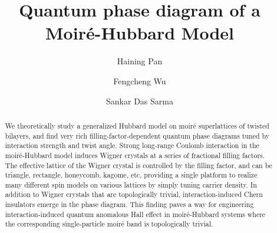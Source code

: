 \documentclass[aps,prl,floatfix,twocolumn]{revtex4-1}
\begin{document}
	
	\title{Quantum phase diagram of a Moir\'e-Hubbard Model}

\author{Haining Pan}
\author{Fengcheng Wu}
\author{Sankar Das Sarma}

\begin{abstract}
	We theoretically study a generalized Hubbard model on moir\'e superlattices of twisted bilayers, and find very rich filling-factor-dependent quantum phase diagrams tuned by interaction strength and twist angle. Strong long-range Coulomb interaction in the moir\'e-Hubbard model induces Wigner crystals at a series of fractional filling factors. The effective lattice of the Wigner crystal is controlled by the filling factor, and can be triangle, rectangle, honeycomb, kagome, etc, providing a single platform to realize many different spin models on various lattices by simply tuning carrier density. In addition to Wigner crystals that are topologically trivial, interaction-induced Chern insulators emerge in the phase diagram. This finding paves a way for engineering interaction-induced quantum anomalous Hall effect in moir\'e-Hubbard systems where the corresponding single-particle moir\'e band is topologically trivial.
\end{abstract}

\maketitle
\end{document}
